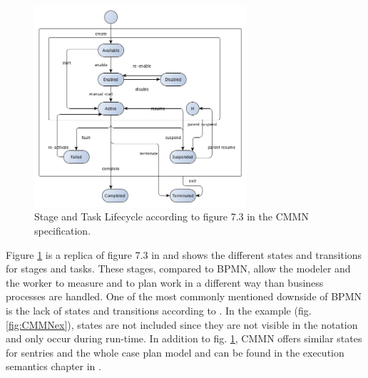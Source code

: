 \begin{figure}
  \centering
\includegraphics[width=0.7\textwidth]{../figures/chapter_indicators/CMMN_Stage_and_Task_Lifecycle_CMMN.png} 
\caption{Stage and Task Lifecycle according to figure 7.3 in the CMMN specification.}
  \label{fig:CMMNstates}
\end{figure}

Figure \ref{fig:CMMNstates} is a replica of figure 7.3 in \cite{CMMNspec2014} and shows the different states and transitions for stages and tasks. These stages, compared to BPMN, allow the modeler and the worker to measure and to plan work in a different way than business processes are handled. One of the most commonly mentioned downside of BPMN is the lack of states and transitions according to \cite{Recker2010}. In the example (fig. \ref{fig:CMMNex}), states are not included since they are not visible in the notation and only occur during run-time. In addition to fig. \ref{fig:CMMNstates}, CMMN offers similar states for sentries and the whole case plan model and can be found in the execution semantics chapter in \cite{CMMNspec2014}. \\

